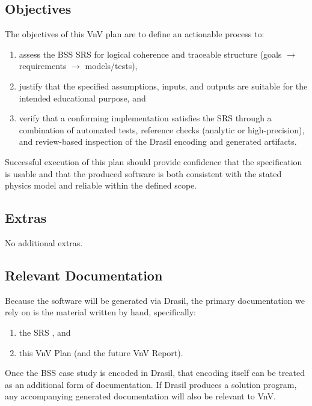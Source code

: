 \documentclass[12pt, titlepage]{article}
\begin{document}
\subsection{Objectives}

The objectives of this VnV plan are to define an actionable process to:

\begin{enumerate}
  \item assess the BSS SRS \cite{SRS} for logical coherence and traceable structure
  (goals $\rightarrow$ requirements $\rightarrow$ models/tests),
  \item justify that the specified assumptions, inputs, and outputs are suitable
  for the intended educational purpose, and
  \item verify that a conforming implementation satisfies the SRS through a
  combination of automated tests, reference checks (analytic or high-precision),
  and review-based inspection of the Drasil encoding and generated artifacts.
\end{enumerate}

Successful execution of this plan should provide confidence that the
specification is usable and that the produced software is both consistent with
the stated physics model and reliable within the defined scope.

\subsection{Extras}

No additional extras.

\subsection{Relevant Documentation}

Because the software will be generated via Drasil, the primary documentation we
rely on is the material written by hand, specifically:
\begin{enumerate}
  \item the SRS \cite{SRS}, and
  \item this VnV Plan (and the future VnV Report).
\end{enumerate}

Once the BSS case study is encoded in Drasil, that encoding itself can be treated
as an additional form of documentation. If Drasil produces a solution program,
any accompanying generated documentation will also be relevant to VnV.
\end{document}
